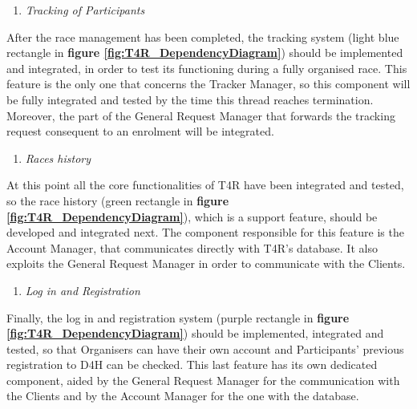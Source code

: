     \newpage
    \begin{enumerate} [resume]
        \item \emph{Tracking of Participants}
    \end{enumerate}
    After the race management has been completed, the tracking system (light blue rectangle in \textbf{figure \ref{fig:T4R_DependencyDiagram}}) should be implemented and integrated, in order to test its functioning during a fully organised race. This feature is the only one that concerns the Tracker Manager, so this component will be fully integrated and tested by the time this thread reaches termination. Moreover, the part of the General Request Manager that forwards the tracking request consequent to an enrolment will be integrated.
    \\
    \begin{enumerate} [resume]
        \item \emph{Races history}
    \end{enumerate}
    At this point all the core functionalities of T4R have been integrated and tested, so the race history (green rectangle in \textbf{figure \ref{fig:T4R_DependencyDiagram}}), which is a support feature, should be developed and integrated next. The component responsible for this feature is the Account Manager, that communicates directly with T4R's database. It also exploits the General Request Manager in order to communicate with the Clients.
    
    \begin{enumerate} [resume]
        \item \emph{Log in and Registration}
    \end{enumerate}
    Finally, the log in and registration system (purple rectangle in \textbf{figure \ref{fig:T4R_DependencyDiagram}}) should be implemented, integrated and tested, so that Organisers can have their own account and Participants' previous registration to D4H can be checked. This last feature has its own dedicated component, aided by the General Request Manager for the communication with the Clients and by the Account Manager for the one with the database.
    
    
    
    
    
    
    
    
    
    
